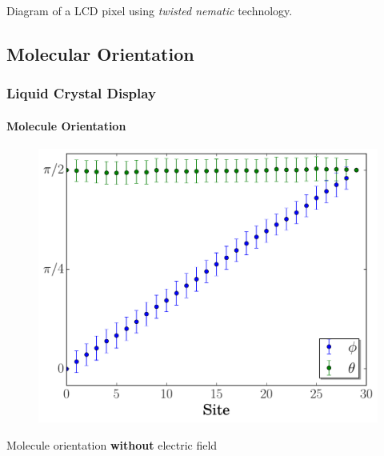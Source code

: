 \documentclass{beamer}
\begin{document}
\begin{frame}
\begin{figure}[h!]
        \label{freedericksz} 
    \end{figure}

\center
\vspace{-0.3cm}
Diagram of a LCD pixel using \textit{twisted nematic} technology.
\end{frame}
\subsection{Molecular Orientation}
\begin{frame}
	\frametitle{Liquid Crystal Display}
	\framesubtitle{Molecule Orientation}
    \begin{figure}[h!]
    \includegraphics[scale=0.48]{figures/lcd_allume_T01.pdf}
    \end{figure}
\vspace{-0.6cm}
\center
Molecule orientation \textbf{without} electric field
\end{frame}
\end{document}
